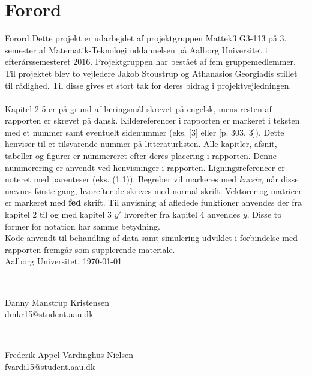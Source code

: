 \clearpage
\chapter*{Forord}
{Forord}
Dette projekt er udarbejdet af projektgruppen Mattek3 G3-113 på 3. semester af Matematik-Teknologi uddannelsen på Aalborg Universitet i efterårssemesteret 2016. Projektgruppen har bestået af fem gruppemedlemmer. Til projektet blev to vejledere Jakob Stoustrup og Athanasios Georgiadis stillet til rådighed. Til disse gives et stort tak for deres bidrag i projektvejledningen.
\\ \\
Kapitel 2-5 er på grund af læringsmål skrevet på engelsk, mens resten af rapporten er skrevet på dansk. Kildereferencer i rapporten er markeret i teksten med et nummer samt eventuelt sidenummer (eks. [3] eller [p. 303, 3]). Dette henviser til et tilsvarende nummer på litteraturlisten. Alle kapitler, afsnit, tabeller og figurer er nummereret efter deres placering i rapporten. Denne nummerering er anvendt ved henvisninger i rapporten. Ligningsreferencer er noteret med parenteser (eks. (1.1)). Begreber vil markeres med \textit{kursiv}, når disse nævnes første gang, hvorefter de skrives med normal skrift. Vektorer og matricer er markeret med \textbf{fed} skrift. Til anvisning af afledede funktioner anvendes der fra kapitel 2 til og med kapitel 3 $y'$ hvorefter fra kapitel 4 anvendes $\dot{y}$. Disse to former for notation har samme betydning. 
\\
Kode anvendt til behandling af data samt simulering udviklet i forbindelse med rapporten fremgår som supplerende materiale. 
\\
\vspace{\baselineskip}\hfill Aalborg Universitet, \today
\vfill\noindent
\begin{minipage}[b]{0.45\textwidth}
 \centering
 \rule{\textwidth}{0.5pt}\\
Danny Manstrup Kristensen\\
 {\footnotesize \href{mailto:dmkr15@student.aau.dk}{dmkr15@student.aau.dk}}  
\end{minipage}
\hfill
\begin{minipage}[b]{0.45\textwidth}
 \centering
 \rule{\textwidth}{0.5pt}\\
Frederik Appel Vardinghus-Nielsen\\
 {\footnotesize \href{mailto:fvardi15@student.aau.dk}{fvardi15@student.aau.dk}}
\end{minipage}
\vspace{3\baselineskip}
